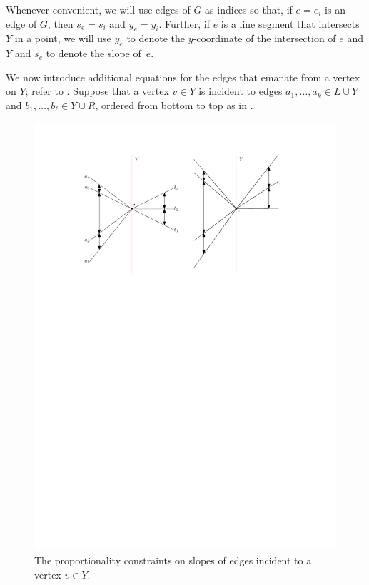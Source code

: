 Whenever convenient, we will use edges of $G$
as indices so that, if $e=e_i$ is an edge of $G$, then $s_e=s_i$
and $y_e=y_i$.  Further, if $e$ is a line segment that
intersects $Y$ in a point, we will use $y_e$ to denote the $y$-coordinate
of the intersection of $e$ and $Y$ and $s_e$ to denote the slope of~$e$. %


We now introduce additional equations for the edges that emanate from a
vertex on $Y$; refer to .
Suppose that a vertex $v\in Y$ is incident to edges $a_1,\ldots,a_k\in L\cup Y$ 
and $b_1,\ldots,b_\ell\in Y\cup R$, ordered from bottom to top as in .

\begin{figure}
  \begin{center}
    \includegraphics{figs/proportional}
  \end{center}
  \caption{The proportionality constraints on slopes of edges incident to a vertex $v\in Y$.}
\end{figure}
